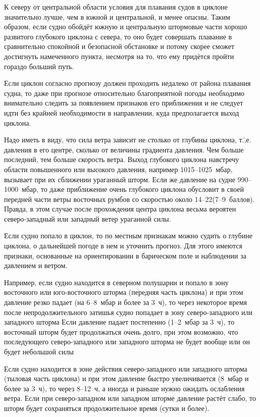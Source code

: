 К северу от центральной области условия для плавания судов в циклоне
значительно лучше, чем в южной и центральной, и менее опасны. Таким
образом, если судно обойдёт южную и центральную штормовые части хорошо
развитого глубокого циклона с севера, то оно будет совершать плавание
в сравнительно спокойной и безопасной обстановке и потому скорее
сможет достигнуть намеченного пункта, несмотря на то, что ему придётся
пройти гораздо больший путь.

Если циклон согласно прогнозу должен проходить недалеко от района
плавания судна, то даже при прогнозе относительно благоприятной погоды
необходимо внимательно следить за появлением признаков его приближения
и не следует идти без крайней необходимости в направлении, куда
предполагается выход циклона.

Надо иметь в виду, что сила ветра зависит не столько от глубины
циклона, т.\=,е. давления в его центре, сколько от величины градиента
давления. Чем больше последний, тем больше скорость ветра. Выход
глубокого циклона навстречу области повышенного или высокого давления,
например 1015--1025~мбар, вызывает при их сближении ураганный
шторм. Если же давление на судне 990--1000~мбар, то даже приближение
очень глубокого циклона обусловит в своей передней части ветры
восточных румбов со скоростью около 14--22\speedms (7--9~баллов). Правда,
в этом случае после прохождения центра циклона весьма вероятен
северо-западный или западный ветер ураганной силы.

Если судно попало в циклон, то по местным признакам можно судить о
глубине циклона, о дальнейшей погоде в нем и уточнить прогноз. Для
этого имеются признаки, основанные на ориентировании в барическом поле
и наблюдении за давлением и ветром.

Например, если судно находится в северном полушарии и попало в зону
восточного или юго-восточного шторма (передняя часть циклона) и при
этом давление резко падает (на 6--8~мбар и более за 3~ч), то через
некоторое время после непродолжительного затишья судно попадает в зону
северо-западного или западного шторма Если давление падает постепенно
(1--2~мбар за 3~ч), то восточный шторм будет продолжаться очень долго,
при этом возможно, что последующего северо-западного или западного
шторма не будет вообще или он будет небольшой силы

Если судно находится в зоне действия северо-западного или западного
шторма (тыловая часть циклона) и при этом давление быстро
увеличивается (8~мбар и более за 3~ч), то через 8--12~ч, а иногда и
раньше нужно ожидать ослабления ветра. Если при северо-западном или
западном шторме давление растёт слабо, то шторм будет сохраняться
продолжительное время (сутки и более).

